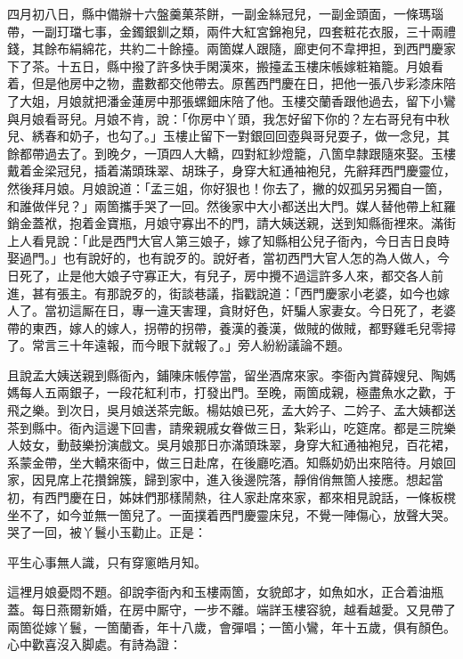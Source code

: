 四月初八日，縣中備辦十六盤羹菓茶餅，一副金絲冠兒，一副金頭面，一條瑪瑙帶，一副玎璫七事，金鐲銀釧之類，兩件大紅宮錦袍兒，四套粧花衣服，三十兩禮錢，其餘布絹綿花，共約二十餘擡。兩箇媒人跟隨，廊吏何不韋押担，到西門慶家下了茶。十五日，縣中撥了許多快手閑漢來，搬擡孟玉樓床帳嫁粧箱籠。月娘看着，但是他房中之物，盡數都交他帶去。原舊西門慶在日，把他一張八步彩漆床陪了大姐，月娘就把潘金蓮房中那張螺鈿床陪了他。{}玉樓交蘭香跟他過去，留下小鸞與月娘看哥兒。月娘不肯，說：「你房中丫頭，我怎好留下你的？左右哥兒有中秋兒、綉春和奶子，也勾了。」玉樓止留下一對銀回回壺與哥兒耍子，做一念兒，其餘都帶過去了。到晚夕，一頂四人大轎，四對紅紗燈籠，八箇皁隸跟隨來娶。玉樓戴着金梁冠兒，插着滿頭珠翠、胡珠子，身穿大紅通袖袍兒，先辭拜西門慶靈位，{}然後拜月娘。月娘說道：「孟三姐，你好狠也！你去了，撇的奴孤另另獨自一箇，和誰做伴兒？」{}兩箇攜手哭了一回。然後家中大小都送出大門。媒人替他帶上紅羅銷金蓋袱，抱着金寶瓶，月娘守寡出不的門，請大姨送親，送到知縣衙裡來。滿街上人看見說：「此是西門大官人第三娘子，嫁了知縣相公兒子衙內，今日吉日良時娶過門。」也有說好的，也有說歹的。說好者，當初西門大官人怎的為人做人，今日死了，止是他大娘子守寡正大，有兒子，房中攪不過這許多人來，都交各人前進，甚有張主。有那說歹的，街談巷議，指戳說道：「西門慶家小老婆，如今也嫁人了。當初這厮在日，專一違天害理，貪財好色，奸騙人家妻女。今日死了，老婆帶的東西，嫁人的嫁人，拐帶的拐帶，養漢的養漢，做賊的做賊，都野雞毛兒零撏了。常言三十年遠報，而今眼下就報了。」旁人紛紛議論不題。{}

且說孟大姨送親到縣衙內，鋪陳床帳停當，留坐酒席來家。李衙內賞薛嫂兒、陶媽媽每人五兩銀子，一段花紅利市，打發出門。至晚，兩箇成親，極盡魚水之歡，于飛之樂。到次日，吳月娘送茶完飯。楊姑娘已死，孟大妗子、二妗子、孟大姨都送茶到縣中。衙內這邊下回書，請衆親戚女眷做三日，紮彩山，吃筵席。都是三院樂人妓女，動鼓樂扮演戲文。吳月娘那日亦滿頭珠翠，身穿大紅通袖袍兒，百花裙，系蒙金帶，坐大轎來衙中，做三日赴席，在後廳吃酒。知縣奶奶出來陪待。月娘回家，因見席上花攢錦簇，歸到家中，進入後邊院落，靜俏俏無箇人接應。想起當初，有西門慶在日，姊妹們那樣鬧熱，往人家赴席來家，都來相見說話，一條板櫈坐不了，如今並無一箇兒了。一面撲着西門慶靈床兒，不覺一陣傷心，放聲大哭。{}哭了一回，被丫鬟小玉勸止。正是：

\begin{myquote}
平生心事無人識，只有穿窻皓月知。
\end{myquote}

這裡月娘憂悶不題。卻說李衙內和玉樓兩箇，女貌郎才，如魚如水，正合着油瓶蓋。每日燕爾新婚，在房中厮守，一步不離。{}端詳玉樓容貌，越看越愛。又見帶了兩箇從嫁丫鬟，一箇蘭香，年十八歲，會彈唱；一箇小鸞，年十五歲，俱有顏色。心中歡喜沒入脚處。有詩為證：

